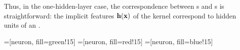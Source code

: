 Thus, in the one-hidden-layer case, the correspondence between \MLP{}s and \gp{}s is straightforward:
the implicit features ${\bf{h}}({\bf{x}})$ of the kernel correspond to hidden units of an \MLP{}.


\newcommand{\numdims}[0]{3}
\newcommand{\numhidden}[0]{3}
\newcommand{\upnodedist}[0]{1cm}
\newcommand{\bardist}[0]{\hspace{-0.2cm}}

\def\layersep{2.3cm}
\def\nodesep{1.3cm}
\def\nodesize{1cm}


\newcommand{\neuronfunc}[2]{
\FPeval{\result}{clip(#1+#2)}
\texttt{[image: ../figures/deep-limits/two-d-draws/sqexp-draw-\\result]}
}

=[neuron, fill=green!15]
=[neuron, fill=red!15]
=[neuron, fill=blue!15]

\newcommand{\indfeat}{h}

